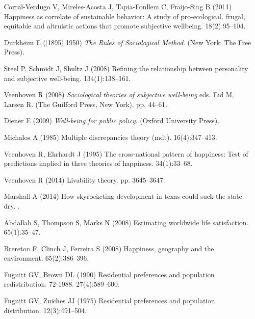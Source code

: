 \documentclass[10pt, letterpaper]{article}
\begin{document}
\begin{spacing}{1.4}
\begin{thebibliography}{10}
Corral-Verdugo V, Mireles-Acosta J, Tapia-Fonllem C, Fraijo-Sing B (2011)
  Happiness as correlate of sustainable behavior: A study of pro-ecological,
  frugal, equitable and altruistic actions that promote subjective wellbeing.
 18(2):95--104.

Durkheim E ([1895] 1950) {\em The Rules of Sociological Method}.
\newblock (New York: The Free Press).

Steel P, Schmidt J, Shultz J (2008) Refining the relationship between
  personality and subjective well-being.
 134(1):138--161.

Veenhoven R (2008) {\em Sociological theories of subjective well-being} eds.{}
  Eid M, Larsen R.
\newblock (The Guilford Press, New York), pp. 44--61.

Diener E (2009) {\em Well-being for public policy}.
\newblock (Oxford University Press).

Michalos A (1985) Multiple discrepancies theory (mdt).
 16(4):347--413.

Veenhoven R, Ehrhardt J (1995) The cross-national pattern of happiness: Test of
  predictions implied in three theories of happiness.
 34(1):33--68.

Veenhoven R (2014) Livability theory.
 pp.
  3645--3647.

Marshall A (2014) How skyrocketing development in texas could suck the state
  dry.
.

Abdallah S, Thompson S, Marks N (2008) Estimating worldwide life satisfaction.
 65(1):35--47.

Brereton F, Clinch J, Ferreira S (2008) Happiness, geography and the
  environment.
 65(2):386--396.

Fuguitt GV, Brown DL (1990) Residential preferences and population
  redistribution: 72-1988.
 27(4):589--600.

Fuguitt GV, Zuiches JJ (1975) Residential preferences and population
  distribution.
 12(3):491--504.


\end{thebibliography}
\end{spacing}
\end{document}
